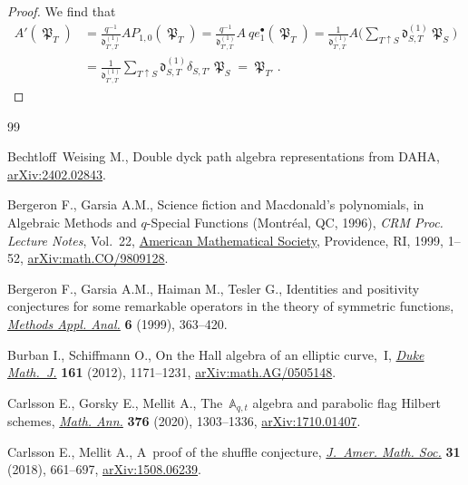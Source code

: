 \documentclass[10pt,a4paper]{amsart}
\numberwithin{equation}{section}
\theoremstyle{definition}
\DeclareMathOperator{\MacD}{\mathfrak{P}}
\begin{document}
\begin{proof}
 We find that
 \begin{align*}
 A'(\MacD_T)& = \frac{q^{-1}}{\mathfrak{d}^{(1)}_{T',T}} A P_{1,0} (\MacD_T)
 = \frac{q^{-1}}{\mathfrak{d}^{(1)}_{T',T}} A~qe_1^{\bullet}(\MacD_T)
 = \frac{1}{\mathfrak{d}^{(1)}_{T',T}}A\biggl( \sum_{T\uparrow S} \mathfrak{d}^{(1)}_{S,T} \MacD_S\biggr) \\
 & = \frac{1}{\mathfrak{d}^{(1)}_{T',T}}\sum_{T\uparrow S} \mathfrak{d}^{(1)}_{S,T} \delta_{S,T'}\MacD_S
 = \MacD_{T'}. \tag*{\qed}
 \end{align*} \renewcommand{\qed}{}
\end{proof}

\begin{thebibliography}{99}
\footnotesize\itemsep=0pt

Bechtloff~Weising M., Double dyck path algebra representations from {DAHA},
 \href{http://arxiv.org/abs/2402.02843}{arXiv:2402.02843}.

Bergeron F., Garsia A.M., Science fiction and {M}acdonald's polynomials, in
 Algebraic {M}ethods and {$q$}\nobreakdash-{S}pecial {F}unctions ({M}ontr\'eal, {QC},
 1996), \textit{CRM Proc. Lecture Notes}, Vol.~22,
 \href{https://doi.org/10.1090/crmp/022/01}{American Mathematical Society},
 Providence, RI, 1999, 1--52,
 \href{http://arxiv.org/abs/math.CO/9809128}{arXiv:math.CO/9809128}.

Bergeron F., Garsia A.M., Haiman M., Tesler G., Identities and positivity
 conjectures for some remarkable operators in the theory of symmetric
 functions, \href{https://doi.org/10.4310/MAA.1999.v6.n3.a7}{\textit{Methods
 Appl. Anal.}} \textbf{6} (1999), 363--420.

Burban I., Schiffmann O., On the {H}all algebra of an elliptic curve,~{I},
 \href{https://doi.org/10.1215/00127094-1593263}{\textit{Duke Math.~J.}}
 \textbf{161} (2012), 1171--1231,
 \href{http://arxiv.org/abs/math/0505148}{arXiv:math.AG/0505148}.

Carlsson E., Gorsky E., Mellit A., The~{$\mathbb{A}_{q,t}$} algebra and
 parabolic flag {H}ilbert schemes,
 \href{https://doi.org/10.1007/s00208-019-01898-1}{\textit{Math. Ann.}}
 \textbf{376} (2020), 1303--1336,
 \href{http://arxiv.org/abs/1710.01407}{arXiv:1710.01407}.

Carlsson E., Mellit A., A~proof of the shuffle conjecture,
 \href{https://doi.org/10.1090/jams/893}{\textit{J.~Amer. Math. Soc.}}
 \textbf{31} (2018), 661--697,
 \href{http://arxiv.org/abs/1508.06239}{arXiv:1508.06239}.


\end{thebibliography}
\end{document}
